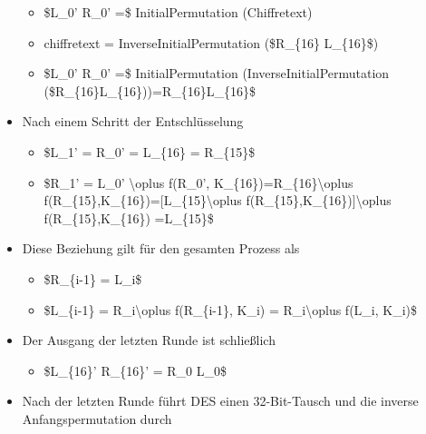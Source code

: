 \documentclass[a4paper]{article}
\begin{document}
\begin{multicols}{3}
\begin{itemize}
              \begin{itemize}
                  \item
                        \$L\_0' \textbar\textbar{} R\_0' =\$ InitialPermutation
                        (Chiffretext)
                  \item
                        chiffretext = InverseInitialPermutation (\$R\_\{16\}
                        \textbar\textbar{} L\_\{16\}\$)
                  \item
                        \$L\_0' \textbar\textbar{} R\_0' =\$ InitialPermutation
                        (InverseInitialPermutation
                        (\$R\_\{16\}\textbar\textbar L\_\{16\}))=R\_\{16\}\textbar\textbar L\_\{16\}\$
              \end{itemize}
        \item
              Nach einem Schritt der Entschlüsselung

              \begin{itemize}
                  \item
                        \$L\_1' = R\_0' = L\_\{16\} = R\_\{15\}\$
                  \item
                        \$R\_1' = L\_0' \textbackslash oplus f(R\_0',
                        K\_\{16\})=R\_\{16\}\textbackslash oplus
                        f(R\_\{15\},K\_\{16\})={[}L\_\{15\}\textbackslash oplus
                        f(R\_\{15\},K\_\{16\}){]}\textbackslash oplus f(R\_\{15\},K\_\{16\})
                        =L\_\{15\}\$
              \end{itemize}
        \item
              Diese Beziehung gilt für den gesamten Prozess als

              \begin{itemize}
                  \item
                        \$R\_\{i-1\} = L\_i\$
                  \item
                        \$L\_\{i-1\} = R\_i\textbackslash oplus f(R\_\{i-1\}, K\_i) =
                        R\_i\textbackslash oplus f(L\_i, K\_i)\$
              \end{itemize}
        \item
              Der Ausgang der letzten Runde ist schließlich

              \begin{itemize}
                  \item
                        \$L\_\{16\}' \textbar\textbar{} R\_\{16\}' = R\_0 \textbar\textbar{}
                        L\_0\$
              \end{itemize}
        \item
              Nach der letzten Runde führt DES einen 32-Bit-Tausch und die inverse
              Anfangspermutation durch


\end{itemize}
\end{multicols}
\end{document}
